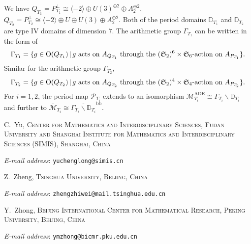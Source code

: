 \documentclass[
]{article}
\begin{document}
We have
\(Q_{T_1}=P_{T_1}^\perp\cong \langle -2\rangle\oplus U(3)^{\oplus 2}\oplus A_2^{\oplus 2}\),
\(Q_{T_2}=P_{T_2}^\perp\cong \langle -2\rangle\oplus U\oplus U(3)\oplus A_2^{\oplus 2}\).
Both of the period domains \(\mathbb{D}_{T_1}\) and \(\mathbb{D}_{T_2}\)
are type IV domains of dimension \(7\). The arithmetic group
\(\Gamma_{T_1}\) can be written in the form of
\[\Gamma_{T_1} = \{ g\in\mathrm{O}(Q_{T_1}) \,|\, g \textup{ acts on } A_{Q_{T_1}} \textup{ through the } (\mathfrak{S}_2)^6\times\mathfrak{S}_6\textup{-action on } A_{P_{T_1}} \}.\]
Similar for the arithmetic group \(\Gamma_{T_2}\),
\[\Gamma_{T_2} = \{ g\in\mathrm{O}(Q_{T_2}) \,|\, g \textup{ acts on } A_{Q_{T_2}} \textup{ through the } (\mathfrak{S}_2)^4\times\mathfrak{S}_4\textup{-action on } A_{P_{T_2}} \}.\]
For \(i=1,2\), the period map \(\mathscr{P}_{T_i}\) extends to an
isomorphism
\(\mathcal{M}_{T_i}^{\mathrm{ADE}} \cong \Gamma_{T_i} \backslash \mathbb{D}_{T_i}\)
and further to
\(\overline{\mathcal{M}}_{T_i} \cong \overline{\Gamma_{T_i} \backslash \mathbb{D}_{T_i}}^{\mathrm{bb}}\).



\bigskip

\footnotesize

C.~Yu, \textsc{Center for Mathematics and Interdisciplinary Sciences,
Fudan University and Shanghai Institute for Mathematics and
Interdisciplinary Sciences (SIMIS), Shanghai, China}

\nopagebreak

\emph{E-mail address}: \texttt{yuchenglong@simis.cn}

\medskip

Z.~Zheng, \textsc{Tsinghua University, Beijing, China}

\nopagebreak

\emph{E-mail address}: \texttt{zhengzhiwei@mail.tsinghua.edu.cn}

\medskip

Y.~Zhong, \textsc{Beijing International Center for Mathematical
Research, Peking University, Beijing, China}

\nopagebreak

\emph{E-mail address}: \texttt{ymzhong@bicmr.pku.edu.cn}
\end{document}
